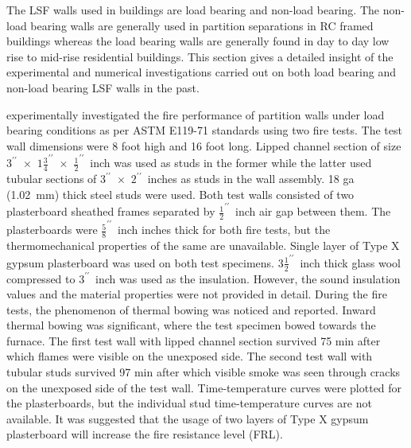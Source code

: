 The LSF walls used in buildings are load bearing and non-load bearing. The non-load bearing walls are generally used in partition separations in RC framed buildings whereas the load bearing walls are generally found in day to day low rise to mid-rise residential buildings. This section gives a detailed insight of the experimental and numerical investigations carried out on both load bearing and non-load bearing LSF walls in the past.

\citet{Son} experimentally investigated the fire performance of partition walls under load bearing conditions as per ASTM E119-71 standards using two fire tests. The test wall dimensions were 8 foot high and 16 foot long. Lipped channel section of size $3^{\prime\prime}$~$\times$~$1\tfrac{3}{4}^{\prime\prime}$~$\times$~$\tfrac{1}{2}^{\prime\prime}$~inch was used as studs in the former while the latter used tubular sections of $3^{\prime\prime}$~$\times$~$2^{\prime\prime}$~inches as studs in the wall assembly. 18 ga (1.02~mm) thick steel studs were used. Both test walls consisted of two plasterboard sheathed frames separated by $\tfrac{1}{2}^{\prime\prime}$~inch air gap between them. The plasterboards were $\tfrac{5}{8}^{\prime\prime}$~inch inches thick for both fire tests, but the thermomechanical properties of the same are unavailable. Single layer of Type X gypsum plasterboard was used on both test specimens. $3\tfrac{1}{2}^{\prime\prime}$~inch thick glass wool compressed to $3^{\prime\prime}$~inch was used as the insulation. However, the sound insulation values and the material properties were not provided in detail. During the fire tests, the phenomenon of thermal bowing was noticed and reported. Inward thermal bowing was significant, where the test specimen bowed towards the furnace. The first test wall with lipped channel section survived 75 min after which flames were visible on the unexposed side. The second test wall with tubular studs survived 97 min after which visible smoke was seen through cracks on the unexposed side of the test wall. Time-temperature curves were plotted for the plasterboards, but the individual stud time-temperature curves are not available. It was suggested that the usage of two layers of Type X gypsum plasterboard will increase the fire resistance level (FRL).   

